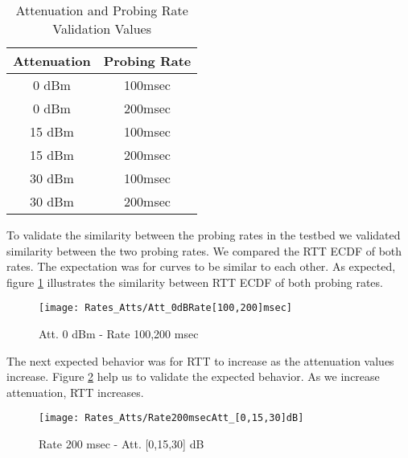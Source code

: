 \begin{table}[h]
\begin{center}
	\begin{tabular}{||c c||}
		\hline
		Attenuation & Probing Rate\\ [0.5ex] 
		\hline\hline
		0 dBm & 100msec\\ 
		\hline
		0 dBm & 200msec\\
		\hline
		15 dBm & 100msec\\
		\hline
		15 dBm & 200msec\\
		\hline
		30 dBm & 100msec\\
		\hline
		30 dBm & 200msec\\ [1ex] 
		\hline
	\end{tabular}
\end{center}
\caption{Attenuation and Probing Rate Validation Values}
\label{table:Att_Rate_Test_Values}
\end{table}

To validate the similarity between the probing rates in the testbed we validated similarity between the two probing rates. We compared the RTT ECDF of both rates. The expectation was for curves to be similar to each other. As expected, figure \ref{image:att_0_100and200msec} illustrates the similarity between RTT ECDF of both probing rates.

\begin{figure}[h]
	\centering
	\texttt{[image: Rates\_Atts/Att\_0dBRate[100,200]msec]}
	\caption{Att. 0 dBm - Rate 100,200 msec}
	\label{image:att_0_100and200msec}
\end{figure}

The next expected behavior was for RTT to increase as the attenuation values increase. Figure \ref{image:rate_200msec_Att_0_15_30dBm} help us to validate the expected behavior. As we increase attenuation, RTT increases.

\begin{figure}[h]
	\centering
	\texttt{[image: Rates\_Atts/Rate200msecAtt\_[0,15,30]dB]}
	\caption{Rate 200 msec - Att. [0,15,30] dB}
	\label{image:rate_200msec_Att_0_15_30dBm}
\end{figure}